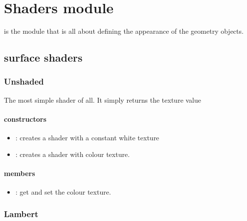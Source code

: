 % 

\chapter{Shaders module}

 is the module that is all about defining the appearance of the geometry objects.

\section{surface shaders}

\subsection{Unshaded}\label{shaders.Unshaded}

The most simple shader of all.  It simply returns the texture value

\subsubsection*{constructors}
\begin{itemize}
	\item {}: 
		creates a shader with a constant white texture
	\item {}:
		creates a shader with colour texture.
\end{itemize}

\subsubsection*{members}
\begin{itemize}
	\item {}: 
		get and set the colour texture.
\end{itemize}



\subsection{Lambert}\label{shaders.Lambert}

